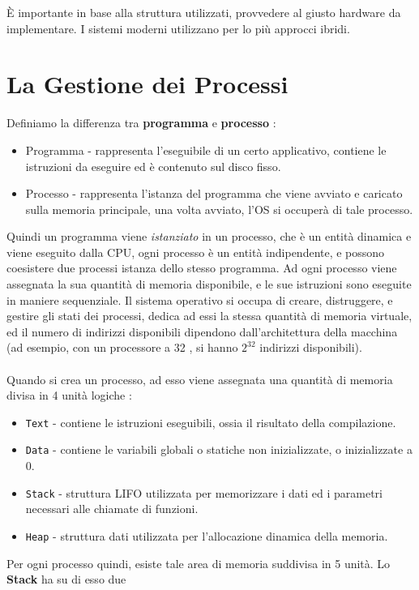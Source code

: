 \documentclass[12pt, letterpaper]{article}
\newcommand{\code}[1]{\colorbox{light-gray}{\texttt{#1}}}
\begin{document}
È importante in base alla struttura utilizzati, provvedere al giusto hardware da implementare. I sistemi 
moderni utilizzano per lo più approcci ibridi.\newpage
\section{La Gestione dei Processi}
Definiamo la differenza tra \textbf{programma} e \textbf{processo} :
\begin{itemize}
    \item Programma - rappresenta l'eseguibile di un certo applicativo, contiene le istruzioni da eseguire ed 
     è contenuto sul disco fisso. 
     \item Processo - rappresenta l'istanza del programma che viene avviato e caricato sulla memoria principale,
     una volta avviato, l'OS si occuperà di tale processo. 
\end{itemize}
Quindi un programma viene \textit{istanziato} in un processo, che è un entità dinamica e viene eseguito 
dalla CPU, ogni processo è un entità indipendente, e possono coesistere due processi istanza dello stesso
programma. Ad ogni processo viene assegnata la sua quantità di memoria disponibile, e le sue istruzioni sono 
eseguite in maniere sequenziale. Il sistema operativo si occupa di creare, distruggere, e gestire gli stati 
dei processi, dedica ad essi la stessa quantità di memoria virtuale, ed il numero di indirizzi disponibili dipendono 
dall'architettura della macchina (ad esempio, con un processore a 32 , si hanno \(2^{32}\) indirizzi disponibili).
\\\hphantom{.}\\
Quando si crea un processo, ad esso viene assegnata una quantità di memoria divisa in 4 unità logiche :
\begin{itemize}
    \item \code{Text} - contiene le istruzioni eseguibili, ossia il risultato della compilazione.
    \item \code{Data} - contiene le variabili globali o statiche non inizializzate, o inizializzate a 0.
    \item \code{Stack} - struttura LIFO utilizzata per memorizzare i dati ed i parametri necessari alle chiamate di funzioni.
    \item \code{Heap} - struttura dati utilizzata per l'allocazione dinamica della memoria.
\end{itemize}
Per ogni processo quindi, esiste tale area di memoria suddivisa in 5 unità. Lo \textbf{Stack} ha su di esso due 
\end{document}
